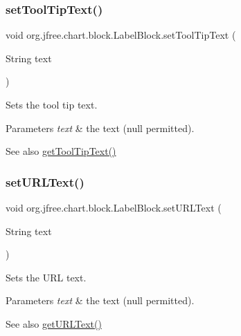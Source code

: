 \subsubsection{\texorpdfstring{set\+Tool\+Tip\+Text()}{setToolTipText()}}
{\footnotesize\ttfamily void org.\+jfree.\+chart.\+block.\+Label\+Block.\+set\+Tool\+Tip\+Text (\begin{DoxyParamCaption}\item[{String}]{text }\end{DoxyParamCaption})}

Sets the tool tip text.


\begin{DoxyParams}{Parameters}
{\em text} & the text ({\ttfamily null} permitted).\\
\hline
\end{DoxyParams}
\begin{DoxySeeAlso}{See also}
\mbox{\hyperlink{classorg_1_1jfree_1_1chart_1_1block_1_1_label_block_a4a3b1ea9db36840c94af45dbe48a8859}{get\+Tool\+Tip\+Text()}} 
\end{DoxySeeAlso}
\mbox{\label{classorg_1_1jfree_1_1chart_1_1block_1_1_label_block_a4897e250d1de9464ecdab9ced2b6aa5d}} 
\subsubsection{\texorpdfstring{set\+U\+R\+L\+Text()}{setURLText()}}
{\footnotesize\ttfamily void org.\+jfree.\+chart.\+block.\+Label\+Block.\+set\+U\+R\+L\+Text (\begin{DoxyParamCaption}\item[{String}]{text }\end{DoxyParamCaption})}

Sets the U\+RL text.


\begin{DoxyParams}{Parameters}
{\em text} & the text ({\ttfamily null} permitted).\\
\hline
\end{DoxyParams}
\begin{DoxySeeAlso}{See also}
\mbox{\hyperlink{classorg_1_1jfree_1_1chart_1_1block_1_1_label_block_a79574c2d0dfe0ac5407e20f96abce42b}{get\+U\+R\+L\+Text()}} 
\end{DoxySeeAlso}


